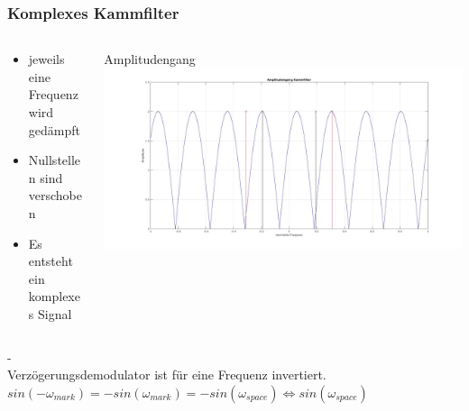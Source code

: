 \documentclass{beamer}
\begin{document}
\begin{frame}
	\frametitle{Komplexes Kammfilter}
	\begin{columns}
		\begin{column}{0.3\textwidth}
			
			\begin{itemize}
				\item jeweils eine Frequenz wird gedämpft
				\item Nullstellen sind verschoben
				\item Es entsteht ein komplexes Signal
			\end{itemize}
		\end{column}
		\begin{column}{0.7\textwidth}
			Amplitudengang
			\includegraphics[width=\textwidth]{images/comb.png}
		\end{column}
	\end{columns} 
	  -\\
	Verzögerungsdemodulator ist für eine Frequenz invertiert.
	$sin(-\omega_{mark}) = -sin(\omega_{mark}) = -sin(\omega_{space}) \Longleftrightarrow sin(\omega_{space})$
\end{frame}
\end{document}
